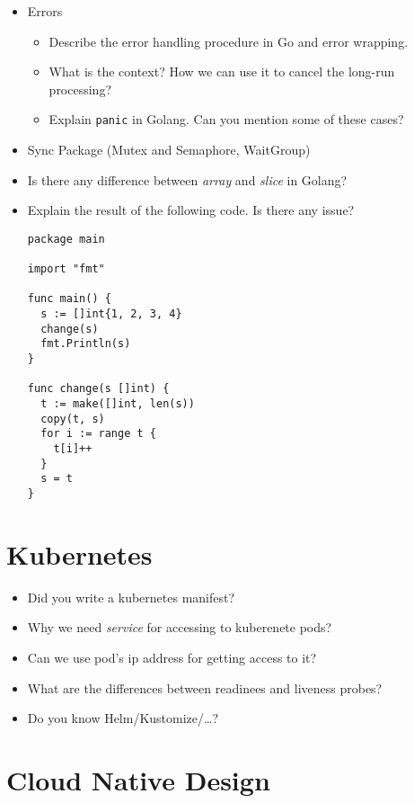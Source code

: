 \documentclass[]{book}
\begin{document}
\begin{itemize}
  \item Errors
    \begin{itemize}
      \item  Describe the error handling procedure in Go and error wrapping.
      \item What is the context? How we can use it to cancel the long-run processing?
      \item Explain \texttt{panic} in Golang. Can you mention some of these cases?
    \end{itemize}

  \item Sync Package (Mutex and Semaphore, WaitGroup)
  \item Is there any difference between \textit{\color{YellowOrange} array} and \textit{\color{YellowOrange} slice} in Golang?
  \item Explain the result of the following code. Is there any issue?
    \begin{verbatim}
package main

import "fmt"

func main() {
  s := []int{1, 2, 3, 4}
  change(s)
  fmt.Println(s)
}

func change(s []int) {
  t := make([]int, len(s))
  copy(t, s)
  for i := range t {
    t[i]++
  }
  s = t
}
    \end{verbatim}

\end{itemize}

\section{Kubernetes}

\begin{itemize}
  \item Did you write a kubernetes manifest?
  \item Why we need \textit{service} for accessing to kuberenete pods?
  \item Can we use pod's ip address for getting access to it?
  \item What are the differences between readinees and liveness probes?
  \item Do you know Helm/Kustomize/\ldots?
\end{itemize}

\section{Cloud Native Design}
\end{document}

